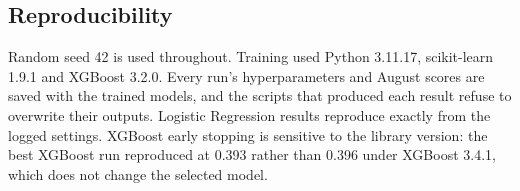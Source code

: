 \subsection{Reproducibility}
Random seed 42 is used throughout. Training used Python 3.11.17, scikit-learn 1.9.1 and XGBoost
3.2.0. Every run's hyperparameters and August scores are saved with the trained models, and the
scripts that produced each result refuse to overwrite their outputs. Logistic Regression results
reproduce exactly from the logged settings. XGBoost early stopping is sensitive to the library
version: the best XGBoost run reproduced at 0.393 rather than 0.396 under XGBoost 3.4.1, which does
not change the selected model.
